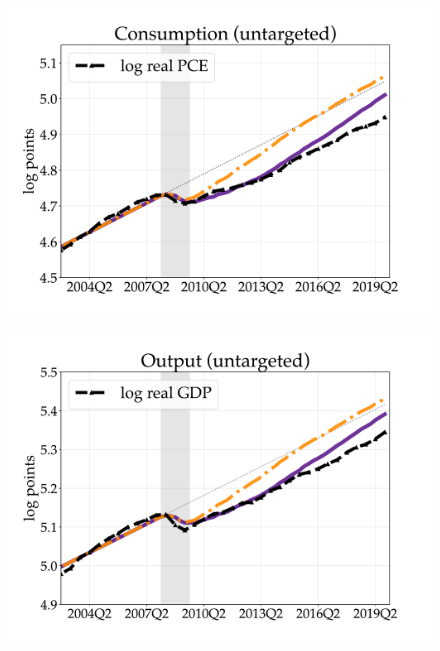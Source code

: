 \begin{figure}[H]
\begin{minipage}{0.51\textwidth}
\includegraphics[scale=.29]{text/chapter1/Figures/GR_sim/Cleaner/Consumption_vs_data_large_new}
\label{fig:c}
\end{minipage}\hspace*{\fill}
\begin{minipage}{0.51\textwidth}
\includegraphics[scale=.29]{text/chapter1/Figures/GR_sim/Cleaner/Output_vs_data_large_new}
 \label{fig:d}
\end{minipage}
\medskip
\begin{minipage}{0.51\textwidth}

\end{minipage}
\end{figure}
